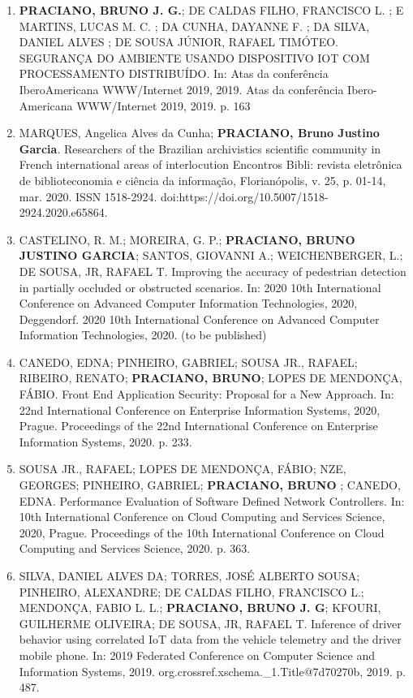 \begin{enumerate}

\item \textbf{PRACIANO, BRUNO J. G.}; DE CALDAS FILHO, FRANCISCO L. ; E MARTINS, LUCAS M. C. ; DA CUNHA, DAYANNE F. ; DA SILVA, DANIEL ALVES ; DE SOUSA JÚNIOR, RAFAEL TIMÓTEO. SEGURANÇA DO AMBIENTE USANDO DISPOSITIVO IOT COM PROCESSAMENTO DISTRIBUÍDO. In: Atas da conferência IberoAmericana WWW/Internet 2019, 2019. Atas da conferência Ibero-Americana WWW/Internet 2019, 2019. p. 163

\item MARQUES, Angelica Alves da Cunha; \textbf{PRACIANO, Bruno Justino Garcia}. Researchers of the Brazilian archivistics scientific community in French international areas of interlocution Encontros Bibli: revista eletrônica de biblioteconomia e ciência da informação, Florianópolis, v. 25, p. 01-14, mar. 2020. ISSN 1518-2924. doi:https://doi.org/10.5007/1518-2924.2020.e65864.

\item CASTELINO, R. M.; MOREIRA, G. P.; \textbf{PRACIANO, BRUNO JUSTINO GARCIA}; SANTOS, GIOVANNI A.; WEICHENBERGER, L.; DE SOUSA, JR, RAFAEL T. Improving the accuracy of pedestrian detection in partially occluded or obstructed scenarios. In: 2020 10th International Conference on Advanced Computer Information Technologies, 2020, Deggendorf. 2020 10th International Conference on Advanced Computer Information Technologies, 2020. (to be published)

\item CANEDO, EDNA; PINHEIRO, GABRIEL; SOUSA JR., RAFAEL; RIBEIRO, RENATO; \textbf{PRACIANO, BRUNO}; LOPES DE MENDONÇA, FÁBIO. Front End Application Security: Proposal for a New Approach. In: 22nd International Conference on Enterprise Information Systems, 2020, Prague. Proceedings of the 22nd International Conference on Enterprise Information Systems, 2020. p. 233.

\item SOUSA JR., RAFAEL; LOPES DE MENDONÇA, FÁBIO; NZE, GEORGES; PINHEIRO, GABRIEL; \textbf{PRACIANO, BRUNO }; CANEDO, EDNA. Performance Evaluation of Software Defined Network Controllers. In: 10th International Conference on Cloud Computing and Services Science, 2020, Prague. Proceedings of the 10th International Conference on Cloud Computing and Services Science, 2020. p. 363.


\item SILVA, DANIEL ALVES DA; TORRES, JOSÉ ALBERTO SOUSA; PINHEIRO, ALEXANDRE; DE CALDAS FILHO, FRANCISCO L.; MENDONÇA, FABIO L. L.; \textbf{PRACIANO, BRUNO J. G}; KFOURI, GUILHERME OLIVEIRA; DE SOUSA, JR, RAFAEL T. Inference of driver behavior using correlated IoT data from the vehicle telemetry and the driver mobile phone. In: 2019 Federated Conference on Computer Science and Information Systems, 2019. org.crossref.xschema.\_1.Title@7d70270b, 2019. p. 487.


\end{enumerate}
